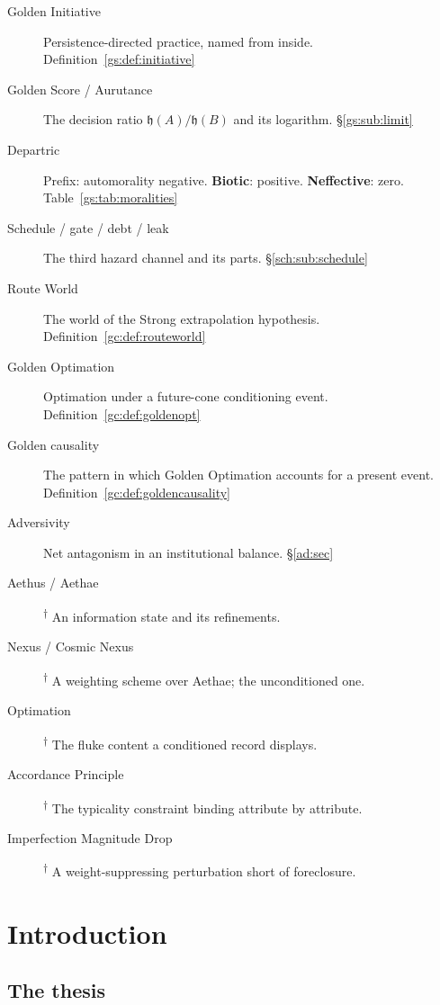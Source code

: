 \documentclass[11pt]{article}
\numberwithin{equation}{section}
\theoremstyle{plain}
\theoremstyle{definition}
\theoremstyle{remark}
\newcommand{\hm}{\mathfrak{h}}
\begin{document}
\begin{description}
\item[Golden Initiative] Persistence-directed practice, named from
inside. Definition~\ref{gs:def:initiative}
\item[Golden Score / Aurutance] The decision ratio $\hm(A)/\hm(B)$ and
its logarithm. \S\ref{gs:sub:limit}
\item[Departric] Prefix: automorality negative. \textbf{Biotic}:
positive. \textbf{Neffective}: zero. Table~\ref{gs:tab:moralities}
\item[Schedule / gate / debt / leak] The third hazard channel and its
parts. \S\ref{sch:sub:schedule}
\item[Route World] The world of the Strong extrapolation hypothesis.
Definition~\ref{gc:def:routeworld}
\item[Golden Optimation] Optimation under a future-cone conditioning
event. Definition~\ref{gc:def:goldenopt}
\item[Golden causality] The pattern in which Golden Optimation accounts
for a present event. Definition~\ref{gc:def:goldencausality}
\item[Adversivity] Net antagonism in an institutional balance.
\S\ref{ad:sec}
\item[Aethus / Aethae]\textsuperscript{$\dagger$} An information state
and its refinements.
\item[Nexus / Cosmic Nexus]\textsuperscript{$\dagger$} A weighting scheme
over Aethae; the unconditioned one.
\item[Optimation]\textsuperscript{$\dagger$} The fluke content a
conditioned record displays.
\item[Accordance Principle]\textsuperscript{$\dagger$} The typicality
constraint binding attribute by attribute.
\item[Imperfection Magnitude Drop]\textsuperscript{$\dagger$} A
weight-suppressing perturbation short of foreclosure.
\end{description}


\section{Introduction}\label{intro:sec}

\subsection{The thesis}\label{intro:sub:thesis}
\end{document}
